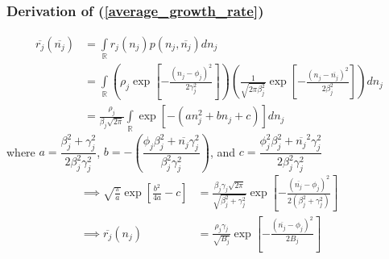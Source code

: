 \documentclass{amsart}
\theoremstyle{definition}
\theoremstyle{remark}
\numberwithin{equation}{section}
\begin{document}
\subsubsection{Derivation of (\ref{average_growth_rate})}
\begin{align*}
	\overline{r_j}(\overline{n_j}) &= \int\limits_{\mathbb{R}}^{}r_j(n_j)p(n_j, \overline{n_j})dn_j \\
	&= \int\limits_{\mathbb{R}}\left(\rho_j\exp\left[-\frac{(n_j - \phi_j)^2}{2\gamma_j^2}\right]\right)\left(\frac{1}{\sqrt{2\pi\beta_j^2}}\exp\left[-\frac{(n_j - \overline{n_j})^2}{2\beta_j^2}\right]\right)dn_j \\
	&= \frac{\rho_j}{\beta_j\sqrt{2\pi}}\int\limits_{\mathbb{R}}\exp\left[-(an_j^2 + bn_j + c)\right]dn_j
\end{align*}
where $a = \dfrac{\beta_j^2 + \gamma_j^2}{2\beta_j^2\gamma_j^2}$, $b = -\left(\dfrac{\phi_j\beta_j^2 + \overline{n_j}\gamma_j^2}{\beta_j^2\gamma_j^2}\right)$, and $c = \dfrac{\phi_j^2\beta_j^2 + \overline{n_j}^2\gamma_j^2}{2\beta_j^2\gamma_j^2}$
\begin{align*}
	\implies \sqrt{\frac{\pi}{a}}\exp\left[\frac{b^2}{4a} - c\right] &= \frac{\beta_j\gamma_j\sqrt{2\pi}}{\sqrt{\beta_j^2 + \gamma_j^2}}\exp\left[-\frac{(\overline{n_j} - \phi_j)^2}{2(\beta_j^2 + \gamma_j^2)}\right] \\
	\implies \overline{r_j}(n_j) &= \frac{\rho_j\gamma_j}{\sqrt{B_j}}\exp\left[-\frac{(\overline{n_j} - \phi_j)^2}{2B_j}\right]
\end{align*}
\end{document}
